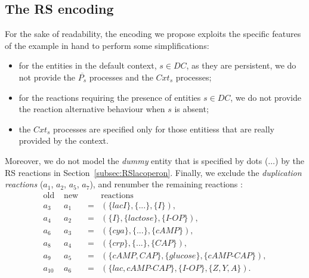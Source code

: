 \subsection{The RS encoding}
For the sake of readability, the encoding we propose exploits the specific features of the example in hand 
to perform some simplifications:
\begin{itemize}
\item for the entities in the default context, $s \in DC$, as they are persistent, we do not provide the $\overline{P_s}$ processes and the $Cxt_s$ processes;
\item for the reactions requiring the presence of entities $s \in DC$, we do not provide the reaction alternative behaviour when $s$ is absent;
\item the $Cxt_s$ processes are specified only for those entitiess that are really provided by the context.
\end{itemize}
Moreover, we do not model the \emph{dummy} entity that is specified by  dots ($\dots$) by the RS reactions in Section~\ref{subsec:RSlacoperon}.
Finally, we exclude the \emph{duplication reactions} ($a_1$, $a_2$, $a_5$, $a_7$), and renumber the remaining reactions :
{\small
\[
\begin{array}{cccl}
\textrm{old } &\textrm{new }&& \textrm{reactions}\\
a_3 &a_1&=&(\{lacI\},\{. . .\},\{I\}),\\
a_4 &a_2&=&(\{I\},\{lactose\},\{I\textrm{-}OP\}),\\
a_6 & a_3&=&(\{cya\},\{. . .\},\{cAMP\}),\\
a_8 &a_4&=&(\{crp\},\{. . .\},\{CAP\}),\\
a_9 &a_5&=&(\{cAMP, CAP\},\{glucose\},\{cAMP\textrm{-}CAP\}),\\
a_{10} & a_6&=& (\{lac, cAMP\textrm{-}CAP\},\{I\textrm{-}OP\},\{Z, Y, A\}).
\end{array}
\]
}
